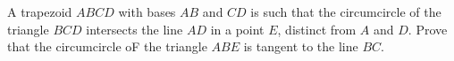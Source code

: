 A trapezoid $ABCD$ with bases $AB$ and $CD$ is such that the circumcircle of the triangle $BCD$ intersects the line $AD$ in a point $E$,  distinct from $A$ and $D$. Prove that the circumcircle oF the triangle $ABE$ is tangent to the line $BC$.